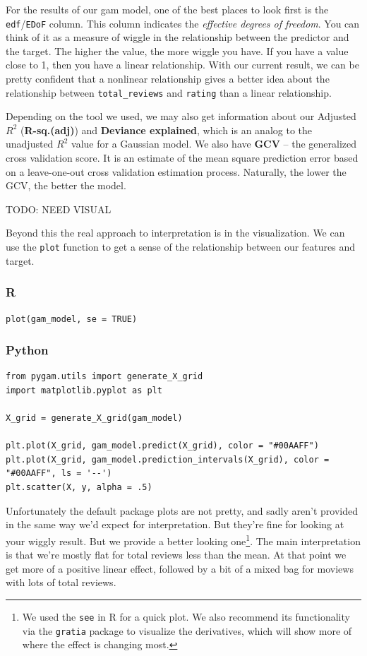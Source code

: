 \documentclass[
  letterpaper,
]{krantz}
\begin{document}
For the results of our gam model, one of the best places to look first
is the \texttt{edf}/\texttt{EDoF} column. This column indicates the
\emph{effective degrees of freedom}. You can think of it as a measure of
wiggle in the relationship between the predictor and the target. The
higher the value, the more wiggle you have. If you have a value close to
1, then you have a linear relationship. With our current result, we can
be pretty confident that a nonlinear relationship gives a better idea
about the relationship between \texttt{total\_reviews} and
\texttt{rating} than a linear relationship.

Depending on the tool we used, we may also get information about our
Adjusted \(R^2\) (\textbf{R-sq.(adj)}) and \textbf{Deviance explained},
which is an analog to the unadjusted \(R^2\) value for a Gaussian model.
We also have \textbf{GCV} -- the generalized cross validation score. It
is an estimate of the mean square prediction error based on a
leave-one-out cross validation estimation process. Naturally, the lower
the GCV, the better the model.

TODO: NEED VISUAL

Beyond this the real approach to interpretation is in the visualization.
We can use the \texttt{plot} function to get a sense of the relationship
between our features and target.

\subsubsection{R}

\begin{verbatim}
plot(gam_model, se = TRUE)
\end{verbatim}

\subsubsection{Python}

\begin{verbatim}
from pygam.utils import generate_X_grid
import matplotlib.pyplot as plt

X_grid = generate_X_grid(gam_model)

plt.plot(X_grid, gam_model.predict(X_grid), color = "#00AAFF")
plt.plot(X_grid, gam_model.prediction_intervals(X_grid), color = "#00AAFF", ls = '--')
plt.scatter(X, y, alpha = .5)
\end{verbatim}

Unfortunately the default package plots are not pretty, and sadly aren't
provided in the same way we'd expect for interpretation. But they're
fine for looking at your wiggly result. But we provide a better looking
one\footnote{We used the \texttt{see} in R for a quick plot. We also
  recommend its functionality via the \texttt{gratia} package to
  visualize the derivatives, which will show more of where the effect is
  changing most.}. The main interpretation is that we're mostly flat for
total reviews less than the mean. At that point we get more of a
positive linear effect, followed by a bit of a mixed bag for moviews
with lots of total reviews.
\end{document}
